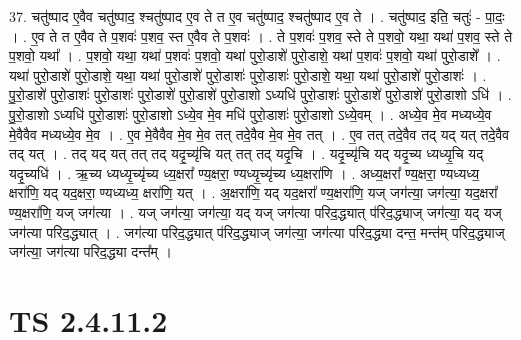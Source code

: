 \documentclass[17pt]{extarticle}
\begin{document}
37. चतु॑ष्पाद ए॒वैव चतु॑ष्पाद॒ श्चतु॑ष्पाद ए॒व ते त ए॒व चतु॑ष्पाद॒ श्चतु॑ष्पाद ए॒व ते । . चतु॑ष्पाद॒ इति॒ चतुः॑ - पा॒दः॒ । . ए॒व ते त ए॒वैव ते प॒शवः॑ प॒शव॒ स्त ए॒वैव ते प॒शवः॑ । . ते प॒शवः॑ प॒शव॒ स्ते ते प॒शवो॒ यथा॒ यथा॑ प॒शव॒ स्ते ते प॒शवो॒ यथा᳚ । . प॒शवो॒ यथा॒ यथा॑ प॒शवः॑ प॒शवो॒ यथा॑ पुरो॒डाशे॑ पुरो॒डाशे॒ यथा॑ प॒शवः॑ प॒शवो॒ यथा॑ पुरो॒डाशे᳚ । . यथा॑ पुरो॒डाशे॑ पुरो॒डाशे॒ यथा॒ यथा॑ पुरो॒डाशे॑ पुरो॒डाशः॑ पुरो॒डाशः॑ पुरो॒डाशे॒ यथा॒ यथा॑ पुरो॒डाशे॑ पुरो॒डाशः॑ । . पु॒रो॒डाशे॑ पुरो॒डाशः॑ पुरो॒डाशः॑ पुरो॒डाशे॑ पुरो॒डाशे॑ पुरो॒डाशो ऽध्यधि॑ पुरो॒डाशः॑ पुरो॒डाशे॑ पुरो॒डाशे॑ पुरो॒डाशो ऽधि॑ । . पु॒रो॒डाशो ऽध्यधि॑ पुरो॒डाशः॑ पुरो॒डाशो ऽध्ये॒व मे॒व मधि॑ पुरो॒डाशः॑ पुरो॒डाशो ऽध्ये॒वम् । . अध्ये॒व मे॒व मध्यध्ये॒व मे॒वैवैव मध्यध्ये॒व मे॒व । . ए॒व मे॒वैवैव मे॒व मे॒व तत् तदे॒वैव मे॒व मे॒व तत् । . ए॒व तत् तदे॒वैव तद् यद् यत् तदे॒वैव तद् यत् । . तद् यद् यत् तत् तद् यदृ॒च्यृ॑चि यत् तत् तद् यदृ॒चि । . यदृ॒च्यृ॑चि यद् यदृ॒च्य ध्यध्यृ॒चि यद् यदृ॒च्यधि॑ । . ऋ॒च्य ध्यध्यृ॒च्यृ॑च्य ध्य॒क्षरा᳚ ण्य॒क्षरा॒ ण्यध्यृ॒च्यृ॑च्य ध्य॒क्षरा॑णि । . अध्य॒क्षरा᳚ ण्य॒क्षरा॒ ण्यध्यध्य॒ क्षरा॑णि॒ यद् यद॒क्षरा॒ ण्यध्यध्य॒ क्षरा॑णि॒ यत् । . अ॒क्षरा॑णि॒ यद् यद॒क्षरा᳚ ण्य॒क्षरा॑णि॒ यज् जग॑त्या॒ जग॑त्या॒ यद॒क्षरा᳚ ण्य॒क्षरा॑णि॒ यज् जग॑त्या । . यज् जग॑त्या॒ जग॑त्या॒ यद् यज् जग॑त्या परिद॒द्ध्यात् प॑रिद॒द्ध्याज् जग॑त्या॒ यद् यज् जग॑त्या परिद॒द्ध्यात् । . जग॑त्या परिद॒द्ध्यात् प॑रिद॒द्ध्याज् जग॑त्या॒ जग॑त्या परिद॒द्ध्या दन्त॒ मन्त॑म् परिद॒द्ध्याज् जग॑त्या॒ जग॑त्या परिद॒द्ध्या दन्त᳚म् । \newline
\pagebreak
{}
\section*{ TS 2.4.11.2 }
\end{document}
